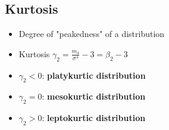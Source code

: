 \subsection*{Kurtosis}
\begin{itemize}
    \item Degree of "peakedness" of a distribution
    \item Kurtosis $\gamma_2 = \frac{m_4}{\sigma^4} - 3 = \beta_2 - 3$
    \item $\gamma_2 < 0$: \textbf{platykurtic distribution}
    \item $\gamma_2 = 0$: \textbf{mesokurtic distribution}
    \item $\gamma_2 > 0$: \textbf{leptokurtic distribution}
\end{itemize}
